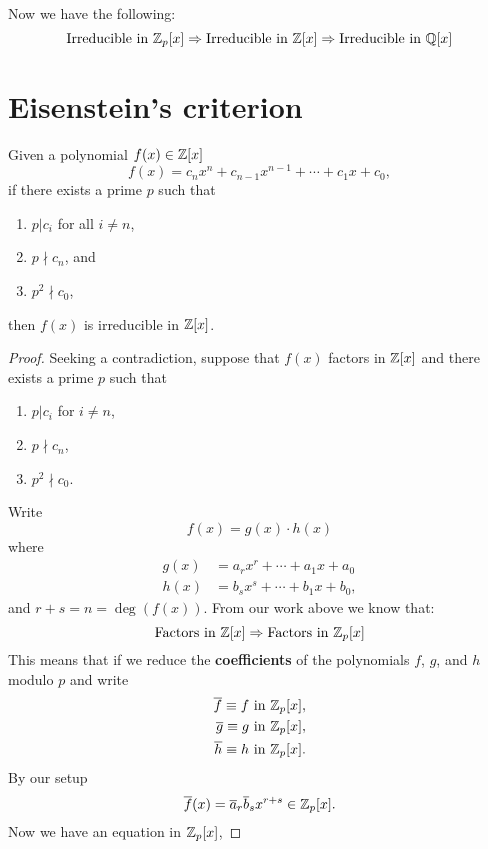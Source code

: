 \documentclass{ximera}
\begin{document}
Now we have the following:
\[
\text{Irreducible in $\mathbb Z_p[x]$} \Rightarrow \text{Irreducible in $\mathbb Z[x]$}  \Rightarrow \text{Irreducible in $\mathbb Q[x]$}
\]


\section{Eisenstein's criterion}



\begin{theorem}\label{T:ec}
  Given a polynomial $f(x) \in\mathbb Z[x]$
  \[
  f(x) = c_nx^n + c_{n-1}x^{n-1} + \cdots + c_1 x + c_0,
  \]
  if there exists a prime $p$ such that
  \begin{enumerate}
  \item $p|c_i$ for all $i \ne n$,
  \item $p\nmid c_n$, and
  \item $p^2\nmid c_0$,
  \end{enumerate}
  then $f(x)$ is irreducible in $\mathbb Z[x]$.
  \begin{proof}
    Seeking a contradiction, suppose that $f(x)$ factors in $\mathbb Z[x]$
    and there exists a prime $p$ such that
    \begin{enumerate}
    \item $p|c_i$ for $i \ne n$,
    \item $p\nmid c_n$,
  \item $p^2\nmid c_0$.
    \end{enumerate}
    Write
    \[
    f(x) = g(x) \cdot h(x)
    \]
    where
    \begin{align*}
      g(x) &= a_rx^r + \cdots + a_1 x+ a_0\\
      h(x) &= b_sx^s + \cdots + b_1 x+ b_0,
    \end{align*}
    and $r + s = n = \deg(f(x))$. From our work above we know that:
    \[
    \text{Factors in $\mathbb Z[x]$} \Rightarrow \text{Factors in $\mathbb Z_p[x]$} 
    \]
    This means that if we reduce the \textbf{coefficients} of the
    polynomials $f$, $g$, and $h$ modulo $p$ and write
    \begin{align*}
      \overline{f} \equiv f \ \text{in $\mathbb Z_p[x]$},\\
      \overline{g} \equiv g \ \text{in $\mathbb Z_p[x]$},\\
      \overline{h} \equiv h \ \text{in $\mathbb Z_p[x]$}.
    \end{align*}
    By our setup
    \[
    \overline{f}(x) =  \overline{a}_r\overline{b}_sx^{r+s} \in \mathbb Z_p[x].
    \]
    Now we have an equation in $\mathbb Z_p[x]$,

\end{proof}
\end{theorem}
\end{document}
